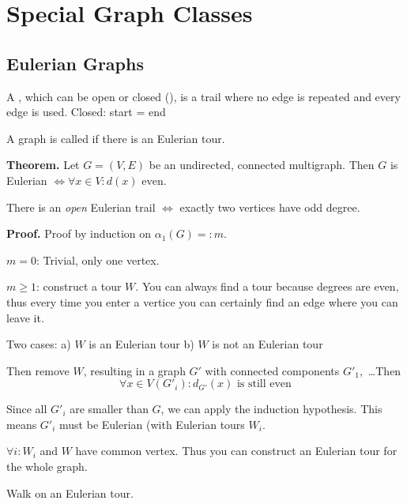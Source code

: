 

\section{Special Graph Classes}

\subsection{Eulerian Graphs}

\begin{definition}
A , which can be open or closed (), is a trail where no edge is repeated and every edge is used. Closed: start = end
\end{definition}

\begin{definition}
A graph is called  if there is an Eulerian tour.
\end{definition}

\textbf{Theorem.}
Let $G=(V,E)$ be an undirected, connected multigraph. Then $G$ is Eulerian $\iff \forall x\in V: d(x)\text{ even}$.

There is an \emph{open} Eulerian trail $\iff$ exactly two vertices have odd degree.

\textbf{Proof.}
Proof by induction on $\alpha_1(G) =: m$.

$m = 0$: Trivial, only one vertex.

$m ≥ 1$: construct a tour $W$. You can always find a tour because degrees are even, thus every time you enter a vertice you can certainly find an edge where you can leave it.

Two cases:
a) $W$ is an Eulerian tour
b) $W$ is not an Eulerian tour

Then remove $W$, resulting in a graph $G'$ with connected components $G'_1$,~\ldots Then
\[
    \forall x\in V(G'_{i}): d_{G'}(x)\text{ is still even}
\]

Since all $G'_{i}$ are smaller than $G$, we can apply the induction hypothesis. This means $G'_{i}$ must be Eulerian (with Eulerian tours $W_{i}$.

$\forall i: W_i$ and $W$ have common vertex. Thus you can construct an Eulerian tour for the whole graph.



Walk on an Eulerian tour. 











